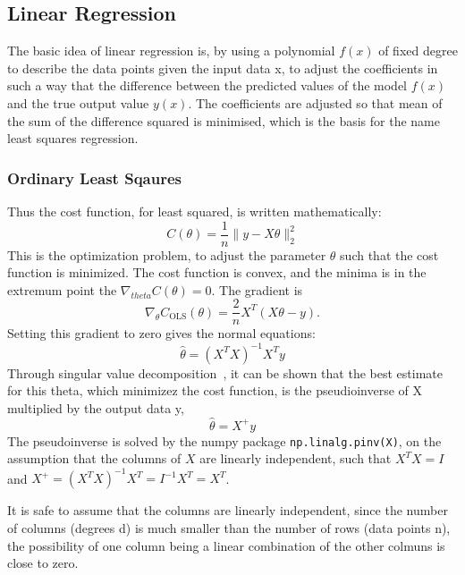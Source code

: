 \documentclass[aps,rmp,reprint,raggedbottom,amsmath,amssymb,longbibliography]{revtex4-1}
\begin{document}
\subsection{Linear Regression}
The basic idea of linear regression is, by using a polynomial $f(x)$
of fixed degree to describe the data points given the input
data x, to adjust the coefficients in such a way that the difference
between the predicted values of the model $f(x)$ and the true output value
$y(x)$. The coefficients are adjusted so that mean of the sum of the difference squared
is minimised, which is the basis for the name least squares regression.
\subsubsection{Ordinary Least Sqaures}
Thus the cost function, for least squared, is written mathematically:
\begin{equation}
  C(\theta) = \frac{1}{n}\lVert y - X\theta\rVert_2^2
\end{equation}
\cite[p.~81]{LectureNotes}
This is the optimization problem, to adjust the parameter $\theta$ such that the cost function is minimized.
The cost function is convex, and the minima is in the extremum point the $\nabla_{theta}C(\theta)=0$. 
The gradient is
\begin{equation}
  \nabla_{\theta} C_{\mathrm{OLS}}(\theta)
  = \frac{2}{n}X^T(X\theta-y).
\end{equation}
Setting this gradient to zero gives the normal equations:
\begin{equation}
  \hat{\theta} = (X^{T}X)^{-1}X^{T}y
\end{equation}
\cite[p.~81]{LectureNotes}
Through singular value decomposition~\cite[p.~42]{LectureNotes}, it can be shown that the best estimate for this theta, which
minimizez the cost function, is the pseudioinverse of X multiplied by the output data y,
\begin{equation}
  \hat{\theta} = X^{+}y
\end{equation} \cite[p.~82]{LectureNotes}
The pseudoinverse is solved by the numpy package \texttt{np.linalg.pinv(X)}, on the assumption that
the columns of $X$ are linearly independent, such that $X^{T}X = I$ and $X^{+}=(X^{T}X)^{-1}X^{T}=I^{-1}X^{T}=X^{T}$.

It is safe to assume that the columns are linearly independent, since the number of columns (degrees d) is much smaller than the number of rows (data points n),
the possibility of one column being a linear combination of the other colmuns is close to zero.
\end{document}
